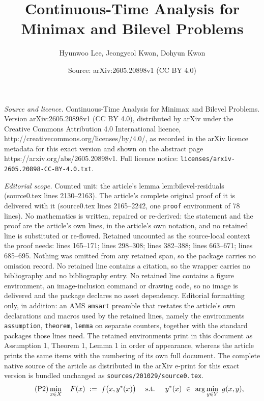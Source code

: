 \documentclass[10pt,a4paper]{amsart}
\title{Continuous-Time Analysis for Minimax and Bilevel Problems}
\author{Hyunwoo Lee, Jeongyeol Kwon, Dohyun Kwon}
\date{Source: arXiv:2605.20898v1 (CC BY 4.0)}
\begin{document}
\maketitle

\noindent\emph{Source and licence.} Continuous-Time Analysis for Minimax and Bilevel Problems. Version arXiv:2605.20898v1 (CC BY 4.0), distributed by arXiv under the Creative Commons Attribution 4.0 International licence, http://creativecommons.org/licenses/by/4.0/, as recorded in the arXiv licence metadata for this exact version and shown on the abstract page https://arxiv.org/abs/2605.20898v1. Full licence notice: \texttt{licenses/arxiv-2605.20898-CC-BY-4.0.txt}.\par\smallskip

\noindent\textit{Editorial scope.} Counted unit: the article's lemma lem:bilevel-residuals (source0.tex lines 2130--2163). The article's complete original proof of it is delivered with it (source0.tex lines 2165--2242, one \texttt{proof} environment of 78 lines). No mathematics is written, repaired or re-derived: the statement and the proof are the article's own lines, in the article's own notation, and no retained line is substituted or re-flowed.  Retained uncounted as the source-local context the proof needs: lines 165--171; lines 298--308; lines 382--388; lines 663--671; lines 685--695.  Nothing was omitted from any retained span, so the package carries no omission record.  No retained line contains a citation, so the wrapper carries no bibliography and no bibliography entry.  No retained line contains a figure environment, an image-inclusion command or drawing code, so no image is delivered and the package declares no asset dependency.  Editorial formatting only, in addition: an AMS \texttt{amsart} preamble that restates the article's own declarations and macros used by the retained lines, namely the environments \texttt{assumption}, \texttt{theorem}, \texttt{lemma} on separate counters, together with the standard packages those lines need.  The retained environments print in this document as Assumption 1, Theorem 1, Lemma 1 in order of appearance, whereas the article prints the same items with the numbering of its own full document.  The complete native source of the article as distributed in the arXiv e-print for this exact version is bundled unchanged as \texttt{sources/201029/source0.tex}.
\begin{equation}\label{eq:problem2}
\tag{\textbf{P2}}
\min_{x\in X}\quad  F(x)\ :=\ f\bigl(x,y^{*}(x)\bigr) 
\quad \text{ s.t. }\quad  y^{*}(x)\ \in\ \arg\min_{y\in Y}\ g(x,y),
\end{equation}
\end{document}
